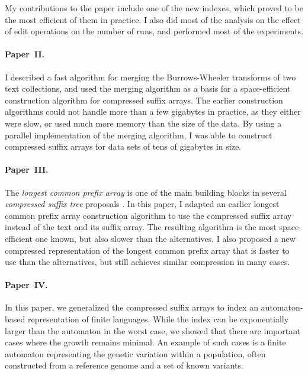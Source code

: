 My contributions to the paper include one of the new indexes, which proved to be the most efficient of them in practice. I also did most of the analysis on the effect of edit operations on the number of runs, and performed most of the experiments.

\paragraph{Paper~II.}

I described a fast algorithm for merging the Burrows-Wheeler transforms of two text collections, and used the merging algorithm as a basis for a space-efficient construction algorithm for compressed suffix arrays. The earlier construction algorithms could not handle more than a few gigabytes in practice, as they either were slow, or used much more memory than the size of the data. By using a parallel implementation of the merging algorithm, I was able to construct compressed suffix arrays for data sets of tens of gigabytes in size.

\paragraph{Paper~III.}

The \emph{longest common prefix array} is one of the main building blocks in several \emph{compressed suffix tree} proposals \cite{Sadakane2007,Fischer2009a,Maekinen2010,Ohlebusch2009,Ohlebusch2010}. In this paper, I adapted an earlier longest common prefix array construction algorithm \cite{Kaerkkaeinen2009} to use the compressed suffix array instead of the text and its suffix array. The resulting algorithm is the most space-efficient one known, but also slower than the alternatives. I also proposed a new compressed representation of the longest common prefix array that is faster to use than the alternatives, but still achieves similar compression in many cases.

\paragraph{Paper~IV.}

In this paper, we generalized the compressed suffix arrays to index an automaton-based representation of finite languages. While the index can be exponentially larger than the automaton in the worst case, we showed that there are important cases where the growth remains minimal. An example of such cases is a finite automaton representing the genetic variation within a population, often constructed from a reference genome and a set of known variants.

